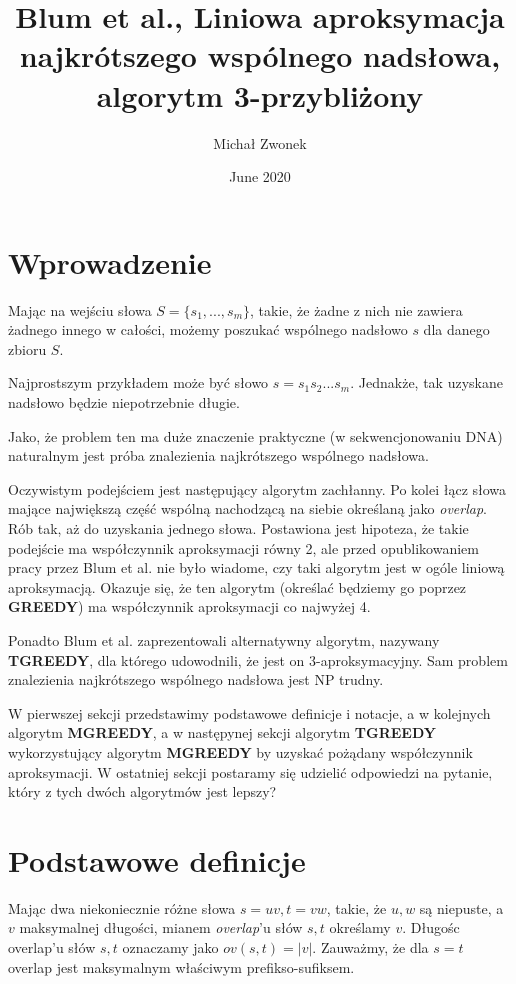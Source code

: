\documentclass[12pt]{article}
\title{Blum et al., Liniowa aproksymacja najkrótszego wspólnego nadsłowa, algorytm 3-przybliżony}
\author{Michał Zwonek}
\date{June 2020}
\theoremstyle{definition}
\begin{document}
\maketitle

\section*{Wprowadzenie}

Mając na wejściu słowa $S = \{s_1,...,s_m\}$, takie, że żadne z nich nie zawiera żadnego innego w całości, możemy poszukać wspólnego nadsłowo $s$ dla danego zbioru $S$.

Najprostszym przykładem może być słowo $s=s_1s_2...s_m$. Jednakże, tak uzyskane nadsłowo będzie niepotrzebnie długie.

Jako, że problem ten ma duże znaczenie praktyczne (w sekwencjonowaniu DNA) naturalnym jest próba znalezienia najkrótszego wspólnego nadsłowa.

Oczywistym podejściem jest następujący algorytm zachłanny. Po kolei łącz słowa mające największą część wspólną nachodzącą na siebie określaną jako \textit{overlap}. Rób tak, aż do uzyskania 
jednego słowa. Postawiona jest hipoteza, że takie podejście ma współczynnik aproksymacji równy 2, ale przed opublikowaniem pracy przez Blum et al. nie było wiadome, czy taki algorytm jest w ogóle liniową aproksymacją. Okazuje się, że ten algorytm (określać będziemy go poprzez \textbf{GREEDY}) ma współczynnik aproksymacji co najwyżej 4.

Ponadto Blum et al. zaprezentowali alternatywny algorytm, nazywany \textbf{TGREEDY}, dla którego udowodnili, że jest on 3-aproksymacyjny. Sam problem znalezienia najkrótszego wspólnego nadsłowa jest NP trudny.

W pierwszej sekcji przedstawimy podstawowe definicje i notacje, a w kolejnych algorytm \textbf{MGREEDY}, a w następynej sekcji algorytm 
\textbf{TGREEDY} wykorzystujący algorytm \textbf{MGREEDY} by uzyskać pożądany współczynnik aproksymacji. W ostatniej sekcji postaramy się udzielić odpowiedzi na pytanie, który z tych dwóch algorytmów jest lepszy? \pagebreak
\section*{Podstawowe definicje}

Mając dwa niekoniecznie różne słowa $s = uv, t = vw$, takie, że $u,w$ są niepuste, a $v$ maksymalnej długości, mianem \textit{overlap}'u słów $s,t$ określamy $v$.
Długośc overlap'u słów $s,t$ oznaczamy jako $ov(s,t) = |v|$. Zauważmy, że dla $s=t$ overlap jest maksymalnym właściwym prefikso-sufiksem. 
\end{document}
